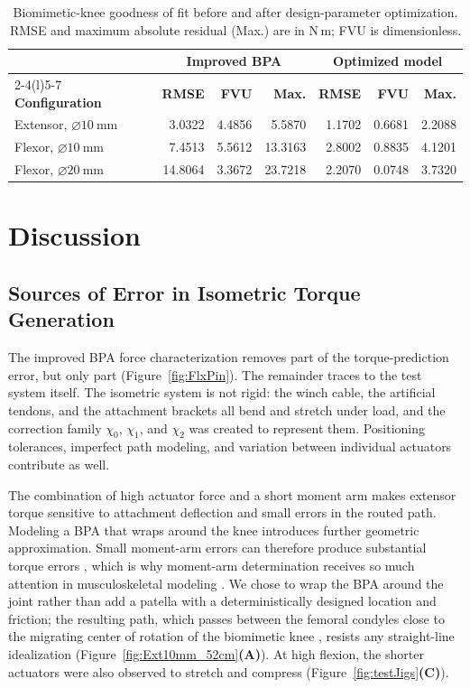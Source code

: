 \documentclass[utf8]{FrontiersinHarvard} %
\begin{document}
\begin{table}[htbp]
\centering\small
\caption{Biomimetic-knee goodness of fit before and after design-parameter optimization. RMSE and maximum absolute residual (Max.) are in $\mathrm{N\,m}$; FVU is dimensionless.}
\label{tab:TorqueFit}
\begin{tabular}{@{}lrrrrrr@{}}
\toprule
 & \multicolumn{3}{c}{\textbf{Improved BPA}} & \multicolumn{3}{c}{\textbf{Optimized model}} \\
\cmidrule(lr){2-4}\cmidrule(l){5-7}
\textbf{Configuration} & \textbf{RMSE} & \textbf{FVU} & \textbf{Max.} & \textbf{RMSE} & \textbf{FVU} & \textbf{Max.} \\
\midrule
Extensor, $\diameter\qty{10}{\mm}$ & 3.0322 & 4.4856 & 5.5870 & 1.1702 & 0.6681 & 2.2088 \\
Flexor, $\diameter\qty{10}{\mm}$ & 7.4513 & 5.5612 & 13.3163 & 2.8002 & 0.8835 & 4.1201 \\
Flexor, $\diameter\qty{20}{\mm}$ & 14.8064 & 3.3672 & 23.7218 & 2.2070 & 0.0748 & 3.7320 \\
\bottomrule
\end{tabular}
\end{table}


\clearpage
\section{Discussion}\label{sec:discussion}

\subsection{Sources of Error in Isometric Torque Generation}\label{sec:disc_error}

The improved BPA force characterization removes part of the torque-prediction error, but only part (Figure~\ref{fig:FlxPin}). The remainder traces to the test system itself. The isometric system is not rigid: the winch cable, the artificial tendons, and the attachment brackets all bend and stretch under load, and the correction family $\chi_{0}$, $\chi_{1}$, and $\chi_{2}$ was created to represent them. Positioning tolerances, imperfect path modeling, and variation between individual actuators contribute as well.

The combination of high actuator force and a short moment arm makes extensor torque sensitive to attachment deflection and small errors in the routed path. Modeling a BPA that wraps around the knee introduces further geometric approximation. Small moment-arm errors can therefore produce substantial torque errors \citep{young_analyzing_2019}, which is why moment-arm determination receives so much attention in musculoskeletal modeling \citep{brand_model_1982, menegaldo_moment_2004, suderman_moving_2012}. We chose to wrap the BPA around the joint rather than add a patella with a deterministically designed location and friction; the resulting path, which passes between the femoral condyles close to the migrating center of rotation of the biomimetic knee \citep{steele_biomimetic_2018}, resists any straight-line idealization (Figure~\ref{fig:Ext10mm_52cm}\textbf{(A)}). At high flexion, the shorter actuators were also observed to stretch and compress (Figure~\ref{fig:testJigs}\textbf{(C)}).
\end{document}
